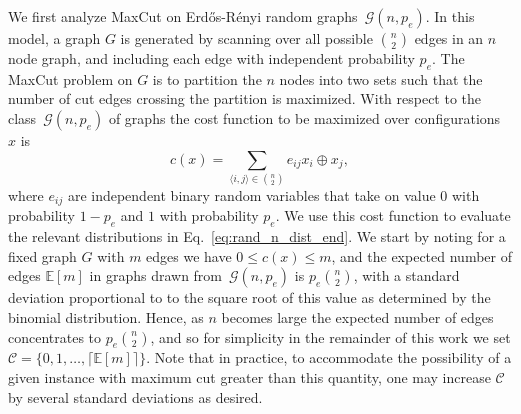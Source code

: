 \documentclass[superscriptaddress,pra,aps,10pt,longbibliography,notitlepage]{revtex4-1}
\begin{document}
We first analyze MaxCut on Erd\H{o}s-R\'{e}nyi random graphs~$\mathcal{G}(n,p_e)$. In this  model, a graph $G$ is generated by scanning over all possible $\binom{n}{2}$ edges in an $n$ node graph, and including each edge with independent probability $p_e$. The MaxCut problem on $G$ is to partition the $n$ nodes into two sets such that the number of cut edges crossing the partition is maximized. With respect to the class~$\mathcal{G}(n,p_e)$ of graphs the cost function to be maximized over configurations $x$ is  
\begin{equation}\label{eq:maxcut_cost_fn}
    c(x) = \sum_{\langle i,j \rangle \in \binom{n}{2}} e_{ij} x_i \oplus x_j,
\end{equation}
where $e_{ij}$ are independent binary random variables that take on value $0$ with probability $1-p_e$ and $1$ with probability $p_e$. We use this cost function to evaluate the relevant distributions in Eq.~\eqref{eq:rand_n_dist_end}. We start by noting for a fixed graph $G$ with $m$ edges we have $0\leq c(x) \leq m$, and the expected number of edges $\mathbb{E}[m]$ in graphs drawn from~$\mathcal{G}(n,p_e)$ is $p_e \binom{n}{2}$, with a standard deviation proportional to to the square root of this value as determined by the binomial distribution. Hence, as $n$ becomes large the expected number of edges concentrates to $p_e \binom{n}{2}$, and so for simplicity in the remainder of this work we set $\mathcal{C}=\{0,1,\dots,\lceil \mathbb{E}[m]\rceil \}$. Note that in practice, to accommodate the possibility of a given instance with maximum cut greater than this quantity, one may %
increase 
$\mathcal{C}$ by several standard deviations as desired.
\end{document}
